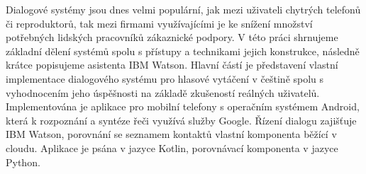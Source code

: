 \documentclass[12pt]{report}
\begin{document}

Dialogové systémy jsou dnes velmi populární, jak mezi uživateli chytrých
telefonů či reproduktorů, tak mezi firmami využívajícími je ke snížení
množství potřebných lidských pracovníků zákaznické podpory. V této práci
shrnujeme základní dělení systémů spolu s přístupy a technikami
jejich konstrukce, následně krátce popisujeme asistenta IBM Watson.
Hlavní částí je představení vlastní implementace dialogového systému
pro hlasové vytáčení v češtině spolu s vyhodnocením jeho úspěšnosti
na základě zkušeností reálných uživatelů. Implementována je aplikace
pro mobilní telefony s operačním systémem Android, která k rozpoznání
a syntéze řeči využívá služby Google. Řízení dialogu zajišťuje IBM Watson,
porovnání se seznamem kontaktů vlastní komponenta běžící v cloudu. Aplikace
je psána v jazyce Kotlin, porovnávací komponenta v jazyce Python.
\end{document}
